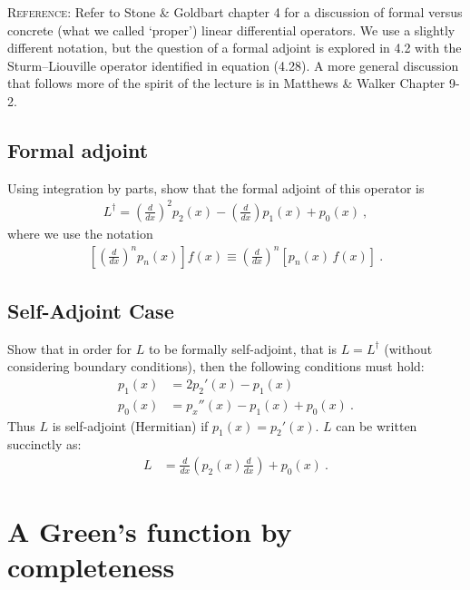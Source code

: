 \documentclass[12pt]{article}
\numberwithin{equation}{section}    %
\begin{document}
\textsc{Reference}: Refer to Stone \& Goldbart chapter 4 for a discussion of formal versus concrete (what we called `proper') linear differential operators. We use a slightly different notation, but the question of a formal adjoint is explored in 4.2 with the Sturm--Liouville operator identified in equation (4.28). A more general discussion that follows more of the spirit of the lecture is in Matthews \& Walker Chapter 9-2.

\subsection{Formal adjoint}
Using integration by parts, show that the formal adjoint of this operator is 
\begin{align}
	L^\dag = \left(\frac{d}{dx}\right)^2 p_2(x)
	- \left(\frac{d}{dx}\right)p_1(x)
	+ p_0(x) \ ,
\end{align}
where we use the notation 
\begin{align}
	\left[\left(\frac{d}{dx}\right)^n p_n(x)\right] f(x) \equiv 
		\left(\frac{d}{dx}\right)^n 
		\left[ p_n(x)\, f(x)\right] \ .
\end{align}

\subsection{Self-Adjoint Case}

Show that in order for $L$ to be formally self-adjoint, that is $L = L^\dag$ (without considering boundary conditions), then the following conditions must hold:
\begin{align}
	p_1(x) &= 2p_2'(x) - p_1(x) \\
	p_0(x) &= p_x''(x) - p_1(x) + p_0(x) \ .
\end{align}
Thus $L$ is self-adjoint (Hermitian) if $p_1(x) = p_2'(x)$. $L$ can be written succinctly as:
\begin{align}
	L &= \frac{d}{dx}
		\left(p_2(x)\frac{d}{dx}\right) + p_0(x) \ .
\end{align}




\section{A Green's function by completeness}


\end{document}

